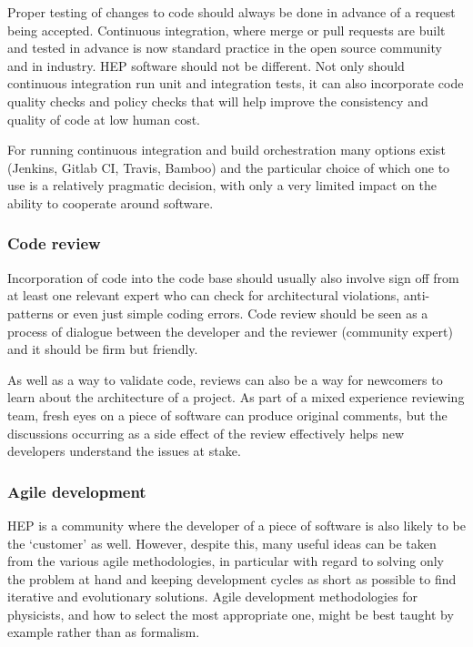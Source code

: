 \documentclass[12pt,a4paper]{article}
\begin{document}
Proper testing of changes to code should always be done in advance of a
request being accepted. Continuous integration, where merge or pull
requests are built and tested in advance is now standard practice in the
open source community and in industry. HEP software should not be
different. Not only should continuous integration run unit and
integration tests, it can also incorporate code quality checks and
policy checks that will help improve the consistency and quality of code
at low human cost.

For running continuous integration and build orchestration many options
exist (Jenkins, Gitlab CI, Travis, Bamboo) and the particular choice of
which one to use is a relatively pragmatic decision, with only a very
limited impact on the ability to cooperate around software.

\hypertarget{code-review}{%
\subsubsection{Code review}\label{code-review}}

Incorporation of code into the code base should usually also involve
sign off from at least one relevant expert who can check for
architectural violations, anti-patterns or even just simple coding
errors. Code review should be seen as a process of dialogue between the
developer and the reviewer (community expert) and it should be firm but
friendly.

As well as a way to validate code, reviews can also be a way for
newcomers to learn about the architecture of a project. As part of a
mixed experience reviewing team, fresh eyes on a piece of software can
produce original comments, but the discussions occurring as a side
effect of the review effectively helps new developers understand the
issues at stake.

\hypertarget{agile-development}{%
\subsubsection{Agile development}\label{agile-development}}

HEP is a community where the developer of a piece of software is also
likely to be the `customer' as well. However, despite this, many useful
ideas can be taken from the various agile methodologies, in particular
with regard to solving only the problem at hand and keeping development
cycles as short as possible to find iterative and evolutionary
solutions. Agile development methodologies for physicists, and how to
select the most appropriate one, might be best taught by example rather
than as formalism.
\end{document}
